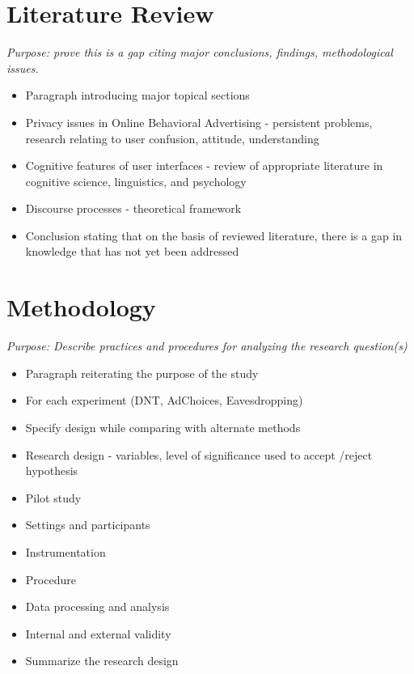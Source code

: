 \section{Literature Review}
\label{literaturereview}

\emph{Purpose: prove this is a gap citing major conclusions, findings, methodological issues.}

\begin{itemize}
\item Paragraph introducing major topical sections

\item Privacy issues in Online Behavioral Advertising - persistent problems, research relating to user confusion, attitude, understanding

\item Cognitive features of user interfaces - review of appropriate literature in cognitive science, linguistics, and psychology

\item Discourse processes - theoretical framework

\item Conclusion stating that on the basis of reviewed literature, there is a gap in knowledge that has not yet been addressed

\end{itemize}

\section{Methodology}
\label{methodology}

\emph{Purpose: Describe practices and procedures for analyzing the research question(s)}

\begin{itemize}
\item Paragraph reiterating the purpose of the study

\item For each experiment (DNT, AdChoices, Eavesdropping)

\item Specify design while comparing with alternate methods

\item Research design - variables, level of significance used to accept \slash  reject hypothesis

\item Pilot study

\item Settings and participants

\item Instrumentation

\item Procedure

\item Data processing and analysis

\item Internal and external validity

\item Summarize the research design

\end{itemize}

